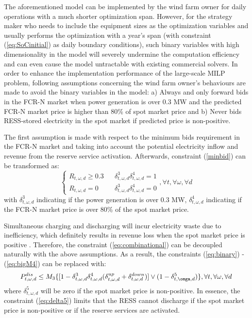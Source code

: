 \documentclass[final,5p,times,twocolumn,authoryear]{elsarticle}
\begin{document}
The aforementioned model can be implemented by the wind farm owner for daily operations with a much shorter optimization span. However, for the strategy maker who needs to include the equipment sizes as the optimization variables and usually performs the optimization with a year's span (with constraint (\ref{eq:SoCinitial}) as daily boundary conditions), such binary variables  with high dimensionality in the model will severely undermine the computation efficiency and can even cause the model untractable with existing commercial solvers. In order to enhance the implementation performance of the large-scale MILP problem, following assumptions concerning the wind farm owner's behaviours are made to avoid the binary variables in the model: a) Always and only forward bids in the FCR-N market when power generation is over 0.3 MW and the predicted FCR-N market price is higher than 80\% of spot market price and b) Never bids RESS-stored electricity in the spot market if predicted price is non-positive.

The first assumption is made with respect to the minimum bids requirement in the FCR-N market and taking into account the potential electricity inflow and revenue from the reserve service activation. Afterwards, constraint (\ref{minbid}) can be transformed as:
\begin{equation} \label{eq:delta34}
\left\{
\begin{array}{lcl}
  R_{t,\omega,d} \geq 0.3 & & {\delta_{t,\omega,d}^3 \delta_{t,\omega,d}^4 = 1}\\
  R_{t,\omega,d} = 0 & & {\delta_{t,\omega,d}^3\delta_{t,\omega,d}^4 =  0}
\end{array} \right. , \forall t,\forall \omega,\forall d
\end{equation}
with $\delta_{t,\omega,d}^{3}$ indicating if the power generation is over 0.3 MW, $\delta_{t,\omega,d}^{4}$  indicating if the FCR-N market price is over 80\% of the spot market price. 

Simultaneous charging and discharging will incur electricity waste due to  inefficiency, which definitely results in revenue loss when the spot market price is positive \cite{Hou2018CooperationMarkets}.  Therefore, the constraint (\ref{eq:combinational}) can be decoupled naturally with the above assumptions. As a result, the constraints (\ref{eq:binary}) - (\ref{eq:bigM4}) can be replaced with:
\begin{equation} \label{eq:delta5}
P_{t,\omega,d}^{dis} \leq M_3\{[1- \delta_{t,\omega,d}^{3} \delta_{t,\omega,d}^{4}(\delta_{t,\omega,d}^{up} + \delta_{t,\omega,d}^{down})]  \vee (1- \delta_{t,\omga,d}^{5})\}, \forall t,\forall \omega,\forall d
\end{equation}
 where $\delta_{t,\omega,d}^{5}$ will be zero if the spot market price is non-positive. In essence, the constraint (\ref{eq:delta5}) limits that the RESS cannot discharge if the spot market price is non-positive or if the reserve services are activated. 
\end{document}
